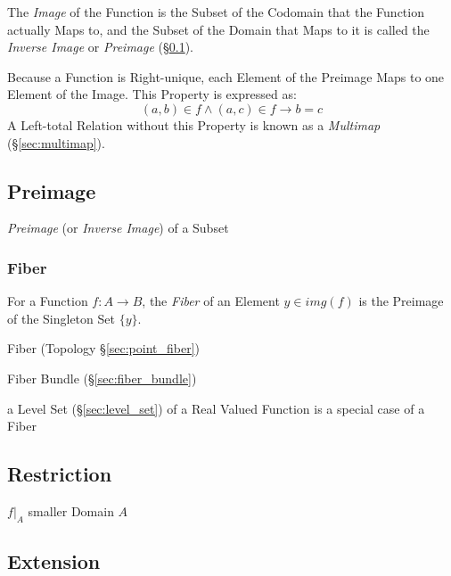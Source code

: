 The \emph{Image} of the Function is the Subset of the Codomain that
the Function actually Maps to, and the Subset of the Domain that Maps
to it is called the \emph{Inverse Image} or \emph{Preimage}
(\S\ref{sec:preimage}).

Because a Function is Right-unique, each Element of the Preimage Maps
to one Element of the Image. This Property is expressed as:
\[
  (a,b) \in f \wedge (a,c) \in f \rightarrow b = c
\]
A Left-total Relation without this Property is known as a
\emph{Multimap} (\S\ref{sec:multimap}).



\subsection{Preimage}\label{sec:preimage}

\emph{Preimage} (or \emph{Inverse Image}) of a Subset



\subsubsection{Fiber}\label{sec:fiber}

For a Function $f : A \rightarrow B$, the \emph{Fiber} of an Element
$y \in img(f)$ is the Preimage of the Singleton Set $\{y\}$.

Fiber (Topology \S\ref{sec:point_fiber})

Fiber Bundle (\S\ref{sec:fiber_bundle})

a Level Set (\S\ref{sec:level_set}) of a Real Valued Function is a special case
of a Fiber



\subsection{Restriction}\label{sec:function_restriction}

$f|_A$ smaller Domain $A$



\subsection{Extension}\label{sec:function_extension}

